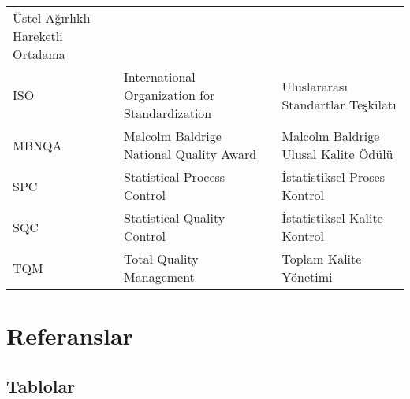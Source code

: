 \documentclass[
]{book}
\begin{document}
\begin{longtable}[]{@{}lll@{}}
\begin{minipage}[t]{0.31\columnwidth}
Üstel Ağırlıklı Hareketli Ortalama\strut
\end{minipage}\tabularnewline
\begin{minipage}[t]{0.31\columnwidth}\raggedright
ISO\strut
\end{minipage} & \begin{minipage}[t]{0.29\columnwidth}\raggedright
International Organization for Standardization\strut
\end{minipage} & \begin{minipage}[t]{0.31\columnwidth}\raggedright
Uluslararası Standartlar Teşkilatı\strut
\end{minipage}\tabularnewline
\begin{minipage}[t]{0.31\columnwidth}\raggedright
MBNQA\strut
\end{minipage} & \begin{minipage}[t]{0.29\columnwidth}\raggedright
Malcolm Baldrige National Quality Award\strut
\end{minipage} & \begin{minipage}[t]{0.31\columnwidth}\raggedright
Malcolm Baldrige Ulusal Kalite Ödülü\strut
\end{minipage}\tabularnewline
\begin{minipage}[t]{0.31\columnwidth}\raggedright
SPC\strut
\end{minipage} & \begin{minipage}[t]{0.29\columnwidth}\raggedright
Statistical Process Control\strut
\end{minipage} & \begin{minipage}[t]{0.31\columnwidth}\raggedright
İstatistiksel Proses Kontrol\strut
\end{minipage}\tabularnewline
\begin{minipage}[t]{0.31\columnwidth}\raggedright
SQC\strut
\end{minipage} & \begin{minipage}[t]{0.29\columnwidth}\raggedright
Statistical Quality Control\strut
\end{minipage} & \begin{minipage}[t]{0.31\columnwidth}\raggedright
İstatistiksel Kalite Kontrol\strut
\end{minipage}\tabularnewline
\begin{minipage}[t]{0.31\columnwidth}\raggedright
TQM\strut
\end{minipage} & \begin{minipage}[t]{0.29\columnwidth}\raggedright
Total Quality Management\strut
\end{minipage} & \begin{minipage}[t]{0.31\columnwidth}\raggedright
Toplam Kalite Yönetimi\strut
\end{minipage}\tabularnewline
\bottomrule
\end{longtable}

\hypertarget{referanslar}{%
\chapter*{Referanslar}\label{referanslar}}

\hypertarget{tablolar}{%
\section{Tablolar}\label{tablolar}}

  
\end{document}
